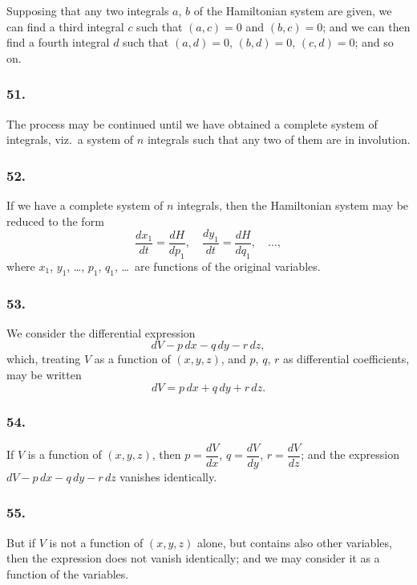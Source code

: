 \documentclass[11pt,a4paper]{book}
\begin{document}
Supposing that any two integrals $a$, $b$ of the Hamiltonian system are given, we can find a third integral $c$ such that $(a, c) = 0$ and $(b, c) = 0$; and we can then find a fourth integral $d$ such that $(a, d) = 0$, $(b, d) = 0$, $(c, d) = 0$; and so on.

\subsubsection*{51.}

The process may be continued until we have obtained a complete system of integrals, viz.~a system of $n$ integrals such that any two of them are in involution.

\subsubsection*{52.}

If we have a complete system of $n$ integrals, then the Hamiltonian system may be reduced to the form
\[
\frac{dx_{1}}{dt} = \frac{dH}{dp_{1}}, \quad \frac{dy_{1}}{dt} = \frac{dH}{dq_{1}}, \quad \ldots,
\]
where $x_{1}$, $y_{1}$, \ldots, $p_{1}$, $q_{1}$, \ldots\ are functions of the original variables.

\newpage
\setcounter{page}{136}

\subsubsection*{53.}

We consider the differential expression
\[
dV - p\,dx - q\,dy - r\,dz,
\]
which, treating $V$ as a function of $(x, y, z)$, and $p$, $q$, $r$ as differential coefficients, may be written
\[
dV = p\,dx + q\,dy + r\,dz.
\]

\subsubsection*{54.}

If $V$ is a function of $(x, y, z)$, then $p = \dfrac{dV}{dx}$, $q = \dfrac{dV}{dy}$, $r = \dfrac{dV}{dz}$; and the expression $dV - p\,dx - q\,dy - r\,dz$ vanishes identically.

\subsubsection*{55.}

But if $V$ is not a function of $(x, y, z)$ alone, but contains also other variables, then the expression does not vanish identically; and we may consider it as a function of the variables.
\end{document}
